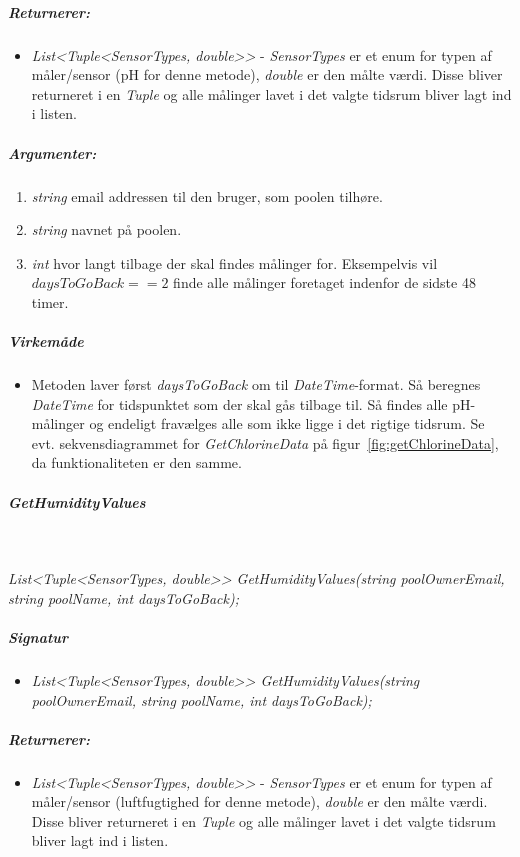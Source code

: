 \subparagraph{Returnerer:}
\begin{itemize}
	\item \textit{List<Tuple<SensorTypes, double>>} - \textit{SensorTypes} er et enum for typen af måler/sensor (pH for denne metode), \textit{double} er den målte værdi. Disse bliver returneret i en \textit{Tuple} og alle målinger lavet i det valgte tidsrum bliver lagt ind i listen.
\end{itemize}

\subparagraph{Argumenter:}
\begin{enumerate}
	\item \textit{string} email addressen til den bruger, som poolen tilhøre.
	\item \textit{string} navnet på poolen.
	\item \textit{int} hvor langt tilbage der skal findes målinger for. Eksempelvis vil $daysToGoBack == 2$ finde alle målinger foretaget indenfor de sidste 48 timer.
\end{enumerate}

\subparagraph{Virkemåde}
\begin{itemize}
	\item Metoden laver først \textit{daysToGoBack} om til \textit{DateTime}-format. Så beregnes \textit{DateTime} for tidspunktet som der skal gås tilbage til. Så findes alle pH-målinger og endeligt fravælges alle som ikke ligge i det rigtige tidsrum. Se evt. sekvensdiagrammet for \textit{GetChlorineData} på figur~\ref{fig:getChlorineData}, da funktionaliteten er den samme.
\end{itemize}

\subparagraph{GetHumidityValues}\ %

\textit{List<Tuple<SensorTypes, double>> GetHumidityValues(string poolOwnerEmail, string poolName, int daysToGoBack);}

\subparagraph{Signatur}
\begin{itemize}
	\item \textit{List<Tuple<SensorTypes, double>> GetHumidityValues(string poolOwnerEmail, string poolName, int daysToGoBack);}
\end{itemize}

\subparagraph{Returnerer:}
\begin{itemize}
	\item \textit{List<Tuple<SensorTypes, double>>} - \textit{SensorTypes} er et enum for typen af måler/sensor (luftfugtighed for denne metode), \textit{double} er den målte værdi. Disse bliver returneret i en \textit{Tuple} og alle målinger lavet i det valgte tidsrum bliver lagt ind i listen.
\end{itemize}

